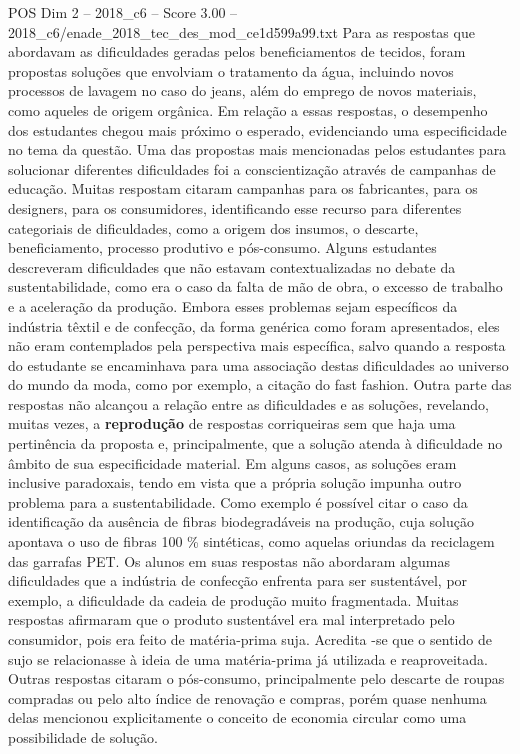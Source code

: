 \begin{textsample}{POS Dim 2 – 2018\_c6 – Score 3.00 – 2018\_c6/enade\_2018\_tec\_des\_mod\_ce1d599a99.txt}
Para as respostas que abordavam as dificuldades geradas pelos beneficiamentos de tecidos, foram propostas soluções que envolviam o tratamento da água, incluindo novos processos de lavagem no caso do jeans, além do emprego de novos materiais, como aqueles de origem orgânica.
Em relação a essas respostas, o desempenho dos estudantes chegou mais próximo o esperado, evidenciando uma especificidade no tema da questão.
Uma das propostas mais mencionadas pelos estudantes para solucionar diferentes dificuldades foi a conscientização através de campanhas de educação.
Muitas respostam citaram campanhas para os fabricantes, para os designers, para os consumidores, identificando esse recurso para diferentes categoriais de dificuldades, como a origem dos insumos, o descarte, beneficiamento, processo produtivo e pós-consumo.
Alguns estudantes descreveram dificuldades que não estavam contextualizadas no debate da sustentabilidade, como era o caso da falta de mão de obra, o excesso de trabalho e a aceleração da produção.
Embora esses problemas sejam específicos da indústria têxtil e de confecção, da forma genérica como foram apresentados, eles não eram contemplados pela perspectiva mais específica, salvo quando a resposta do estudante se encaminhava para uma associação destas dificuldades ao universo do mundo da moda, como por exemplo, a citação do fast fashion.
Outra parte das respostas não alcançou a relação entre as dificuldades e as soluções, revelando, muitas vezes, a \textbf{reprodução} de respostas corriqueiras sem que haja uma pertinência da proposta e, principalmente, que a solução atenda à dificuldade no âmbito de sua especificidade material.
Em alguns casos, as soluções eram inclusive paradoxais, tendo em vista que a própria solução impunha outro problema para a sustentabilidade.
Como exemplo é possível citar o caso da identificação da ausência de fibras biodegradáveis na produção, cuja solução apontava o uso de fibras 100 \% sintéticas, como aquelas oriundas da reciclagem das garrafas PET.
Os alunos em suas respostas não abordaram algumas dificuldades que a indústria de confecção enfrenta para ser sustentável, por exemplo, a dificuldade da cadeia de produção muito fragmentada.
Muitas respostas afirmaram que o produto sustentável era mal interpretado pelo consumidor, pois era feito de matéria-prima suja.
Acredita -se que o sentido de sujo se relacionasse à ideia de uma matéria-prima já utilizada e reaproveitada.
Outras respostas citaram o pós-consumo, principalmente pelo descarte de roupas compradas ou pelo alto índice de renovação e compras, porém quase nenhuma delas mencionou explicitamente o conceito de economia circular como uma possibilidade de solução.

\end{textsample}
